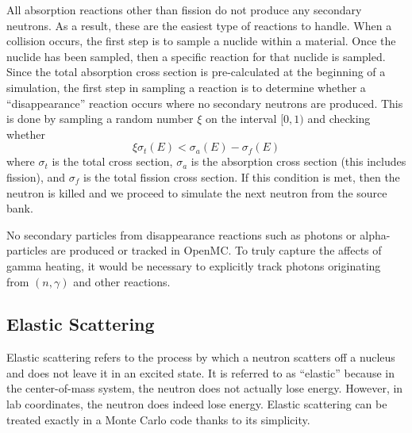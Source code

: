 All absorption reactions other than fission do not produce any secondary
neutrons. As a result, these are the easiest type of reactions to handle. When a
collision occurs, the first step is to sample a nuclide within a material. Once
the nuclide has been sampled, then a specific reaction for that nuclide is
sampled. Since the total absorption cross section is pre-calculated at the
beginning of a simulation, the first step in sampling a reaction is to determine
whether a ``disappearance'' reaction occurs where no secondary neutrons are
produced. This is done by sampling a random number $\xi$ on the interval $[0,1)$
  and checking whether
\begin{equation}
  \label{eq:disappearance}
  \xi \sigma_t (E) < \sigma_a (E) - \sigma_f (E)
\end{equation}
where $\sigma_t$ is the total cross section, $\sigma_a$ is the absorption cross
section (this includes fission), and $\sigma_f$ is the total fission cross
section. If this condition is met, then the neutron is killed and we proceed to
simulate the next neutron from the source bank.

No secondary particles from disappearance reactions such as photons or
alpha-particles are produced or tracked in OpenMC. To truly capture the affects
of gamma heating, it would be necessary to explicitly track photons originating
from $(n,\gamma)$ and other reactions.

\subsection{Elastic Scattering}

Elastic scattering refers to the process by which a neutron scatters off a
nucleus and does not leave it in an excited state. It is referred to as
``elastic'' because in the center-of-mass system, the neutron does not actually
lose energy. However, in lab coordinates, the neutron does indeed lose
energy. Elastic scattering can be treated exactly in a Monte Carlo code thanks
to its simplicity.

